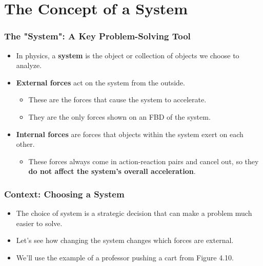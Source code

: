 \documentclass{beamer}
\begin{document}
\section{The Concept of a System}

\begin{frame}
\frametitle{The "System": A Key Problem-Solving Tool}
\begin{itemize}
    \item In physics, a \textbf{system} is the object or collection of objects we choose to analyze. \pause
    \item \textbf{External forces} act on the system from the outside.
    \begin{itemize}
        \item These are the forces that cause the system to accelerate.
        \item They are the only forces shown on an FBD of the system.
    \end{itemize} \pause
    \item \textbf{Internal forces} are forces that objects within the system exert on each other.
    \begin{itemize}
        \item These forces always come in action-reaction pairs and cancel out, so they \textbf{do not affect the system's overall acceleration}.
    \end{itemize}
\end{itemize}
\end{frame}

\begin{frame}
\frametitle{Context: Choosing a System}
\begin{itemize}
    \item The choice of system is a strategic decision that can make a problem much easier to solve. \pause
    \item Let's see how changing the system changes which forces are external. \pause
    \item We'll use the example of a professor pushing a cart from Figure 4.10.
\end{itemize}
\end{frame}
\end{document}
